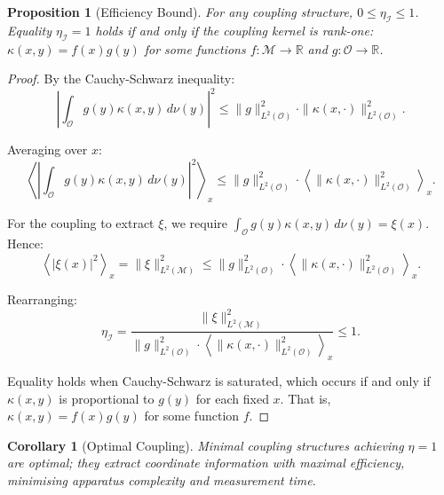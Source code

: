 \documentclass[twocolumn,10pt,a4paper]{article}
\newtheorem{corollary}[theorem]{Corollary}
\newtheorem{proposition}[theorem]{Proposition}
\theoremstyle{remark}
\newcommand{\manifold}{\mathcal{M}}
\newcommand{\oscillator}{\mathcal{O}}
\newcommand{\Reals}{\mathbb{R}}
\begin{document}
\begin{proposition}[Efficiency Bound]
\label{prop:efficiency_bound}
For any coupling structure, $0 \leq \eta_{\mathcal{I}} \leq 1$. Equality $\eta_{\mathcal{I}} = 1$ holds if and only if the coupling kernel is rank-one: $\kappa(x, y) = f(x) g(y)$ for some functions $f: \manifold \to \Reals$ and $g: \oscillator \to \Reals$.
\end{proposition}

\begin{proof}
By the Cauchy-Schwarz inequality:
\begin{equation}
\left| \int_\oscillator g(y) \kappa(x, y) \, d\nu(y) \right|^2 \leq \|g\|_{L^2(\oscillator)}^2 \cdot \|\kappa(x, \cdot)\|_{L^2(\oscillator)}^2.
\end{equation}

Averaging over $x$:
\begin{equation}
\left\langle \left| \int_\oscillator g(y) \kappa(x, y) \, d\nu(y) \right|^2 \right\rangle_x \leq \|g\|_{L^2(\oscillator)}^2 \cdot \left\langle \|\kappa(x, \cdot)\|_{L^2(\oscillator)}^2 \right\rangle_x.
\end{equation}

For the coupling to extract $\xi$, we require $\int_\oscillator g(y) \kappa(x, y) \, d\nu(y) = \xi(x)$. Hence:
\begin{equation}
\left\langle |\xi(x)|^2 \right\rangle_x = \|\xi\|_{L^2(\manifold)}^2 \leq \|g\|_{L^2(\oscillator)}^2 \cdot \left\langle \|\kappa(x, \cdot)\|_{L^2(\oscillator)}^2 \right\rangle_x.
\end{equation}

Rearranging:
\begin{equation}
\eta_{\mathcal{I}} = \frac{\|\xi\|_{L^2(\manifold)}^2}{\|g\|_{L^2(\oscillator)}^2 \cdot \left\langle \|\kappa(x, \cdot)\|_{L^2(\oscillator)}^2 \right\rangle_x} \leq 1.
\end{equation}

Equality holds when Cauchy-Schwarz is saturated, which occurs if and only if $\kappa(x, y)$ is proportional to $g(y)$ for each fixed $x$. That is, $\kappa(x, y) = f(x) g(y)$ for some function $f$.
\end{proof}

\begin{corollary}[Optimal Coupling]
\label{cor:optimal_coupling}
Minimal coupling structures achieving $\eta = 1$ are \emph{optimal}; they extract coordinate information with maximal efficiency, minimising apparatus complexity and measurement time.
\end{corollary}
\end{document}
